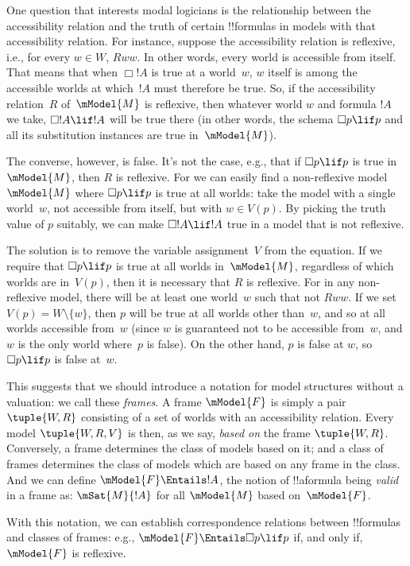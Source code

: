 \documentclass[../../../include/open-logic-section]{subfiles}
\begin{document}


One question that interests modal logicians is the relationship
between the accessibility relation and the truth of certain
!!{formula}s in models with that accessibility relation. For instance,
suppose the accessibility relation is reflexive, i.e., for every $w
\in W$, $Rww$. In other words, every world is accessible from
itself. That means that when $\Box !A$ is true at a world~$w$, $w$
itself is among the accessible worlds at which~$!A$ must therefore be
true. So, if the accessibility relation~$R$ of~$\mModel{M}$ is
reflexive, then whatever world $w$ and formula $!A$ we take, $\Box !A
\lif !A$ will be true there (in other words, the schema $\Box p \lif
p$ and all its substitution instances are true in~$\mModel{M}$).

The converse, however, is false. It's not the case, e.g., that if
$\Box p \lif p$ is true in~$\mModel{M}$, then $R$ is reflexive. For we
can easily find a non-reflexive model~$\mModel{M}$ where $\Box p \lif
p$ is true at all worlds: take the model with a single world~$w$, not
accessible from itself, but with $w \in V(p)$. By picking the truth
value of $p$ suitably, we can make $\Box !A \lif !A$ true in a model
that is not reflexive.

The solution is to remove the variable assignment~$V$ from the
equation. If we require that $\Box p \lif p$ is true at all worlds
in~$\mModel{M}$, regardless of which worlds are in~$V(p)$, then it is
necessary that $R$ is reflexive. For in any non-reflexive model, there
will be at least one world~$w$ such that not $Rww$. If we set $V(p) =
W \setminus \{w\}$, then $p$ will be true at all worlds other
than~$w$, and so at all worlds accessible from~$w$ (since $w$ is
guaranteed not to be accessible from~$w$, and $w$ is the only world
where~$p$ is false). On the other hand, $p$ is false at $w$, so $\Box
p \lif p$ is false at~$w$.

This suggests that we should introduce a notation for model structures
without a valuation: we call these \emph{frames}. A frame $\mModel{F}$
is simply a pair $\tuple{W, R}$ consisting of a set of worlds with an
accessibility relation. Every model $\tuple{W, R, V}$ is then, as we
say, \emph{based on} the frame $\tuple{W, R}$. Conversely, a frame
determines the class of models based on it; and a class of frames
determines the class of models which are based on any frame in the
class. And we can define $\mModel{F} \Entails !A$, the notion of !!a{formula}
being \emph{valid} in a frame as: $\mSat{M}{!A}$ for all $\mModel{M}$
based on~$\mModel{F}$.

With this notation, we can establish correspondence relations between
!!{formula}s and classes of frames: e.g., $\mModel{F} \Entails \Box p \lif p$
if, and only if, $\mModel{F}$ is reflexive.
\end{document}
